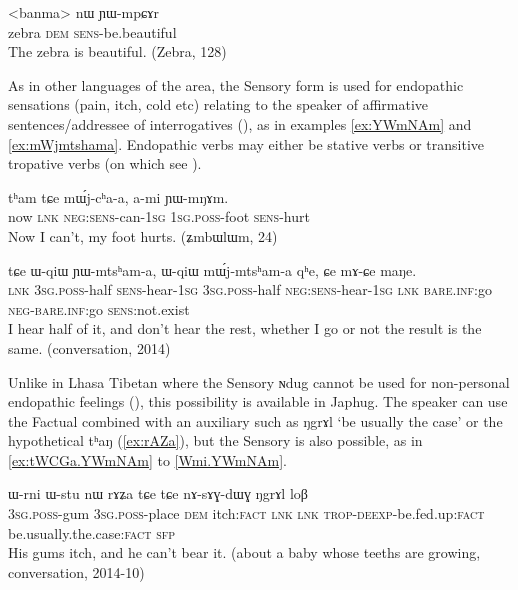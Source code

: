 \documentclass[oldfontcommands,oneside,a4paper,11pt]{article}
\newcommand{\ipa}[1]{{\phon \mbox{#1}}} %
\newcommand{\factual}[1]{\textsc{:fact}}
\begin{document}
\begin{exe}
\ex \label{ex:YWmpCAr}
\gll 
<banma> 	\ipa{nɯ}  	\ipa{ɲɯ-mpɕɤr}  \\
zebra \textsc{dem} \textsc{sens}-be.beautiful \\
\glt The zebra is beautiful. (Zebra, 128)
\end{exe}

As in other languages of the area, the Sensory form is used for endopathic sensations (pain, itch, cold etc)  relating to the speaker of affirmative sentences/addressee of interrogatives (\citealt{tournadre14evidentiality}), as in examples \ref{ex:YWmNAm} and \ref{ex:mWjmtshama}. Endopathic verbs may either be stative verbs or transitive tropative verbs (on which see \citealt{jacques13tropative}).

\begin{exe}
\ex \label{ex:YWmNAm}
\gll
\ipa{tʰam} 	\ipa{tɕe} 	\ipa{mɯ́j-cʰa-a,} 	\ipa{a-mi} 	\ipa{ɲɯ-mŋɤm.} \\
now \textsc{lnk} \textsc{neg:sens}-can-\textsc{1sg} \textsc{1sg.poss}-foot \textsc{sens}-hurt \\
\glt Now I can't, my foot hurts. (\ipa{ʑmbɯlɯm}, 24)
\end{exe}

\begin{exe}
\ex \label{ex:mWjmtshama}
\gll
\ipa{tɕe} 	\ipa{ɯ-qiɯ} 	\ipa{ɲɯ-mtsʰam-a,} 	\ipa{ɯ-qiɯ} 	\ipa{mɯ́j-mtsʰam-a} 	\ipa{qʰe,} 	\ipa{ɕe} 	\ipa{mɤ-ɕe} 	\ipa{maŋe.} \\
\textsc{lnk} \textsc{3sg.poss}-half \textsc{sens}-hear-\textsc{1sg}   \textsc{3sg.poss}-half \textsc{neg:sens}-hear-\textsc{1sg}  \textsc{lnk}  \textsc{bare.inf}:go \textsc{neg}-\textsc{bare.inf}:go \textsc{sens}:not.exist \\
\glt I hear half of it, and don't hear the rest, whether I go or not the result is the same. (conversation, 2014)
\end{exe}


Unlike in Lhasa Tibetan where the Sensory \ipa{ɴdug} cannot be used for non-personal endopathic feelings (\citealt{tournadre14evidentiality}), this possibility is available in Japhug. The speaker can use the Factual combined with an auxiliary such as \ipa{ŋgrɤl}  `be usually the case' or the hypothetical \ipa{tʰaŋ} (\ref{ex:rAZa}), but the Sensory is also possible, as in \ref{ex:tWCGa.YWmNAm} to \ref{Wmi.YWmNAm}.


\begin{exe}
\ex \label{ex:rAZa}
\gll
\ipa{ɯ-rni}  	\ipa{ɯ-stu}  	\ipa{nɯ}  	\ipa{rɤʑa}  	\ipa{tɕe}  	\ipa{tɕe}  	\ipa{nɤ-sɤɣ-dɯɣ}  	\ipa{ŋgrɤl}  	\ipa{loβ}  \\
\textsc{3sg.poss}-gum \textsc{3sg.poss}-place \textsc{dem} itch\factual{} \textsc{lnk} \textsc{lnk} \textsc{trop-deexp}-be.fed.up\factual{} be.usually.the.case\factual{} \textsc{sfp} \\
\glt His gums itch, and he can't bear it. (about a baby whose teeths are growing, conversation, 2014-10)
\end{exe}
\end{document}
